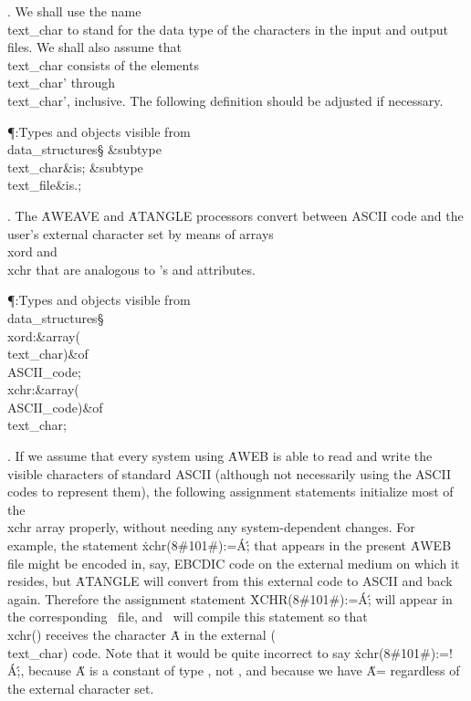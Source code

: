 . We shall use the name \\{text\_char} to stand for the data type of the
characters in the input and output files.  We shall also assume that
\\{text\_char} consists of the elements \\{text\_char}\?'\?
through  \\{text\_char}\?'\?, inclusive. The following
definition should be adjusted if necessary.

\Y\P\?\4:Types and objects visible from \\{data\_structures}\X\mathrel{+}\S%
\?\6
\&{subtype}\8\\{text\_char}\8\&{is}\8;\6
\&{subtype}\8\\{text\_file}\8\&{is}\8\?.\?;\par
\fi

. The \.{AWEAVE} and \.{ATANGLE} processors convert between ASCII code and
the user's external character set by means of arrays \\{xord} and \\{xchr}
that are analogous to \ADA's  and  attributes.

\Y\P\?\4:Types and objects visible from \\{data\_structures}\X\mathrel{+}\S%
\?\6
\\{xord}\?:\1\&{array}\8\1(\?\\{text\_char}\?\2)\2\8\&{of}\?\8\\{ASCII\_code};%
\6
\\{xchr}\?:\1\&{array}\8\1(\?\\{ASCII\_code}\?\2)\2\8\&{of}\?\8\\{text\_char};%
\par
\fi

. If we assume that every system using \.{AWEB} is able to read and write
the
visible characters of standard ASCII (although not necessarily using the
ASCII codes to represent them), the following assignment statements
initialize most of the \\{xchr} array properly, without needing any
system-dependent changes. For example, the statement
\.{xchr(8\#101\#):=\'A\';} that appears in the present \.{AWEB} file might be
encoded in, say, {\mc EBCDIC} code on the external medium on which it
resides, but \.{ATANGLE} will convert from this external code to ASCII and
back again. Therefore the assignment statement \.{XCHR(8\#101\#):=\'A\';}
will appear in the corresponding \ADA\ file, and \ADA\ will compile this
statement so that \\{xchr}\?()\? receives  the character \.A in the
external
(\\{text\_char}) code. Note that it would be quite incorrect to say
\.{xchr(8\#101\#):=\AT!\'A\';}, because \H{A} is a constant of type
, not , and because we have \H{A}\?= regardless of
the
external character set.

